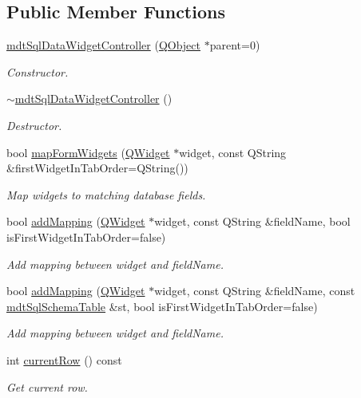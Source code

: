 \subsection*{Public Member Functions}
\begin{DoxyCompactItemize}
\item 
\hyperlink{classmdt_sql_data_widget_controller_a008f0693f9175266e4f8e473888c68e3}{mdt\-Sql\-Data\-Widget\-Controller} (\hyperlink{class_q_object}{Q\-Object} $\ast$parent=0)
\begin{DoxyCompactList}\small\item\em Constructor. \end{DoxyCompactList}\item 
\hyperlink{classmdt_sql_data_widget_controller_aa571144f07b23c84755b249ad74e6f7f}{$\sim$mdt\-Sql\-Data\-Widget\-Controller} ()
\begin{DoxyCompactList}\small\item\em Destructor. \end{DoxyCompactList}\item 
bool \hyperlink{classmdt_sql_data_widget_controller_a2bec243fc6c4c908a9c984946919e244}{map\-Form\-Widgets} (\hyperlink{class_q_widget}{Q\-Widget} $\ast$widget, const Q\-String \&first\-Widget\-In\-Tab\-Order=Q\-String())
\begin{DoxyCompactList}\small\item\em Map widgets to matching database fields. \end{DoxyCompactList}\item 
bool \hyperlink{classmdt_sql_data_widget_controller_a8234727b0d1ef9b2350775d25b2b49fb}{add\-Mapping} (\hyperlink{class_q_widget}{Q\-Widget} $\ast$widget, const Q\-String \&field\-Name, bool is\-First\-Widget\-In\-Tab\-Order=false)
\begin{DoxyCompactList}\small\item\em Add mapping between widget and field\-Name. \end{DoxyCompactList}\item 
bool \hyperlink{classmdt_sql_data_widget_controller_a6a63b9b4d7e4c17e1fc257d43322763e}{add\-Mapping} (\hyperlink{class_q_widget}{Q\-Widget} $\ast$widget, const Q\-String \&field\-Name, const \hyperlink{classmdt_sql_schema_table}{mdt\-Sql\-Schema\-Table} \&st, bool is\-First\-Widget\-In\-Tab\-Order=false)
\begin{DoxyCompactList}\small\item\em Add mapping between widget and field\-Name. \end{DoxyCompactList}\item 
int \hyperlink{classmdt_sql_data_widget_controller_ad757e08bd5dad5d1934885a83324fdf5}{current\-Row} () const 
\begin{DoxyCompactList}\small\item\em Get current row. \end{DoxyCompactList}\end{DoxyCompactItemize}
